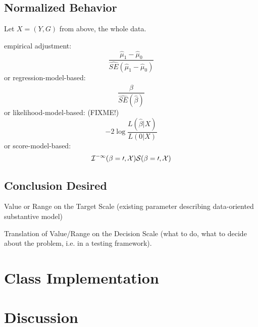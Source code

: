\documentclass{article}
\begin{document}
\subsection{Normalized Behavior}
\label{sec:components:normbeh}
Let $X=(Y,G)$ from above, the whole data.

empirical adjustment:
\begin{equation}
  \label{eq:norm:ex:1}
  \frac{ \hat\mu_1 - \hat\mu_0}%
  {\hat{SE}(\hat\mu_1 - \hat\mu_0)}
\end{equation}
or regression-model-based:
\begin{equation}
  \label{eq:norm:ex:2}
  \frac{ \hat\beta}%
  {\hat{SE}(\hat\beta)}
\end{equation}
or likelihood-model-based: (FIXME!)
\begin{equation}
  \label{eq:norm:ex:3}
  -2 \log \frac{ L(\hat\beta|X)}%
  {L(0|X)}
\end{equation}
or score-model-based:
\begin{equation}
  \label{eq:norm:ex:4}
  \cal{I}^{-1}(\beta=0,X) S(\beta=0,X) 
\end{equation}

\subsection{Conclusion Desired}
\label{sec:component:conclusion}

Value or Range on the Target Scale (existing parameter describing
data-oriented substantive model)

Translation of Value/Range on the Decision Scale (what to do, what to
decide about the problem, i.e. in a testing framework).

\section{Class Implementation}
\label{sec:class}


\section{Discussion}
\label{sec:disc}
\end{document}
